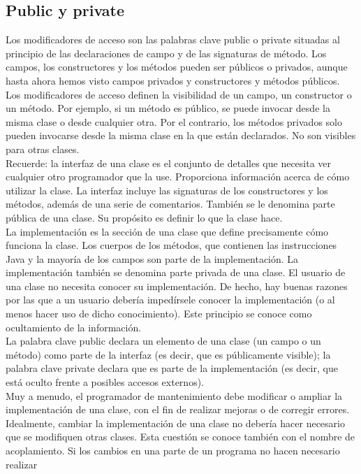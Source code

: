 \documentclass[11pt,a4paper]{article}
\begin{document}
\subsection{Public y private}
Los modificadores de acceso son las palabras clave public o private situadas al principio de las
declaraciones de campo y de las signaturas de método. Los campos, los constructores y los métodos pueden ser públicos o privados, aunque hasta ahora
hemos visto campos privados y constructores y métodos públicos.\\
Los modificadores de acceso definen la visibilidad de un campo, un constructor o un método. Por
ejemplo, si un método es público, se puede invocar desde la misma clase o desde cualquier otra.
Por el contrario, los métodos privados solo pueden invocarse desde la misma clase en la que están
declarados. No son visibles para otras clases.\\
Recuerde: la interfaz de una clase es el conjunto de detalles que necesita ver cualquier otro programador
que la use. Proporciona información acerca de cómo utilizar la clase. La interfaz incluye las
signaturas de los constructores y los métodos, además de una serie de comentarios. También se le
denomina parte pública de una clase. Su propósito es definir lo que la clase hace.
\\
La implementación es la sección de una clase que define precisamente cómo funciona la clase.
Los cuerpos de los métodos, que contienen las instrucciones Java y la mayoría de los campos son
parte de la implementación. La implementación también se denomina parte privada de una clase.
El usuario de una clase no necesita conocer su implementación. De hecho, hay buenas razones
por las que a un usuario debería impedírsele conocer la implementación (o al menos hacer uso de
dicho conocimiento). Este principio se conoce como ocultamiento de la información.\\
La palabra clave public declara un elemento de una clase (un campo o un método) como parte
de la interfaz (es decir, que es públicamente visible); la palabra clave private declara que es
parte de la implementación (es decir, que está oculto frente a posibles accesos externos).\\
Muy a menudo, el programador
de mantenimiento debe modificar o ampliar la implementación de una clase, con el fin de
realizar mejoras o de corregir errores. Idealmente, cambiar la implementación de una clase no
debería hacer necesario que se modifiquen otras clases. Esta cuestión se conoce también con el
nombre de acoplamiento. Si los cambios en una parte de un programa no hacen necesario realizar
\end{document}
